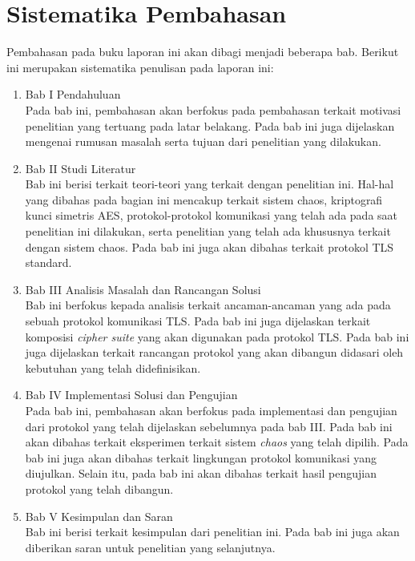 \section{Sistematika Pembahasan}
Pembahasan pada buku laporan ini akan dibagi menjadi beberapa bab. Berikut ini merupakan sistematika penulisan pada laporan ini:

\begin{enumerate}
  \item Bab I Pendahuluan\\
  Pada bab ini, pembahasan akan berfokus pada pembahasan terkait motivasi penelitian yang tertuang pada latar belakang. Pada bab ini juga dijelaskan mengenai rumusan masalah serta tujuan dari penelitian yang dilakukan.

  \item Bab II Studi Literatur\\
  Bab ini berisi terkait teori-teori yang terkait dengan penelitian ini. Hal-hal yang dibahas pada bagian ini mencakup terkait sistem chaos, kriptografi kunci simetris AES, protokol-protokol komunikasi yang telah ada pada saat penelitian ini dilakukan, serta penelitian yang telah ada khususnya terkait dengan sistem chaos. Pada bab ini juga akan dibahas terkait protokol TLS standard.

  \item Bab III Analisis Masalah dan Rancangan Solusi\\
  Bab ini berfokus kepada analisis terkait ancaman-ancaman yang ada pada sebuah protokol komunikasi TLS. Pada bab ini juga dijelaskan terkait komposisi \emph{cipher suite} yang akan digunakan pada protokol TLS. Pada bab ini juga dijelaskan terkait rancangan protokol yang akan dibangun didasari oleh kebutuhan yang telah didefinisikan.

  \item Bab IV Implementasi Solusi dan Pengujian\\
  Pada bab ini, pembahasan akan berfokus pada implementasi dan pengujian dari protokol yang telah dijelaskan sebelumnya pada bab III. Pada bab ini akan dibahas terkait eksperimen terkait sistem \emph{chaos} yang telah dipilih. Pada bab ini juga akan dibahas terkait lingkungan protokol komunikasi yang diujulkan. Selain itu, pada bab ini akan dibahas terkait hasil pengujian protokol yang telah dibangun.

  \item Bab V Kesimpulan dan Saran\\
  Bab ini berisi terkait kesimpulan dari penelitian ini. Pada bab ini juga akan diberikan saran untuk penelitian yang selanjutnya.
\end{enumerate}
